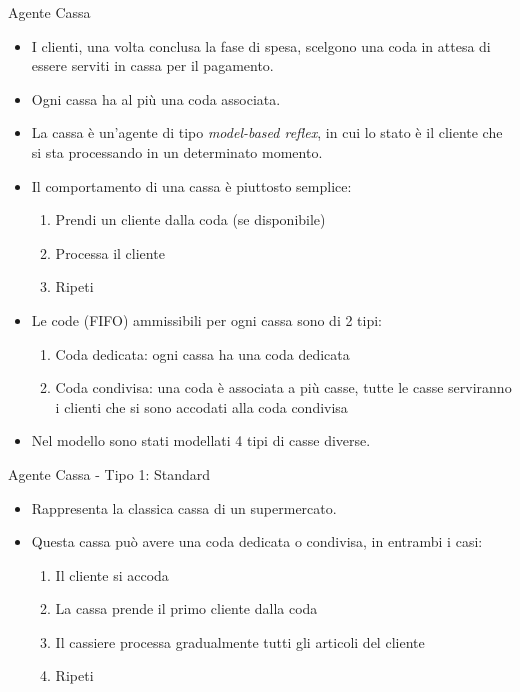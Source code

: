 \begin{frame}{Agente Cassa}
	\begin{itemize}
		\item I clienti, una volta conclusa la fase di spesa, scelgono una coda in attesa di essere serviti in cassa per il pagamento.
		\item Ogni cassa ha al più una coda associata.
		\item La cassa è un'agente di tipo \textit{model-based reflex}, in cui lo stato è il cliente che si sta processando in un determinato momento.
		\item Il comportamento di una cassa è piuttosto semplice:
		\begin{enumerate}
			\item Prendi un cliente dalla coda (se disponibile)
			\item Processa il cliente
			\item Ripeti
		\end{enumerate}
		\item Le code (FIFO) ammissibili per ogni cassa sono di 2 tipi:
		\begin{enumerate}
			\item Coda dedicata: ogni cassa ha una coda dedicata
			\item Coda condivisa: una coda è associata a più casse, tutte le casse serviranno i clienti che si sono accodati alla coda condivisa
		\end{enumerate}
		\item Nel modello sono stati modellati 4 tipi di casse diverse.
		
	\end{itemize}
\end{frame}

\begin{frame}{Agente Cassa - Tipo 1: Standard}
	\begin{itemize}
		\item Rappresenta la classica cassa di un supermercato.
		\item Questa cassa può avere una coda dedicata o condivisa, in entrambi i casi:
		\begin{enumerate}
			\item Il cliente si accoda
			\item La cassa prende il primo cliente dalla coda
			\item Il cassiere processa gradualmente tutti gli articoli del cliente
			\item Ripeti
		\end{enumerate}		
	\end{itemize}
\end{frame}


